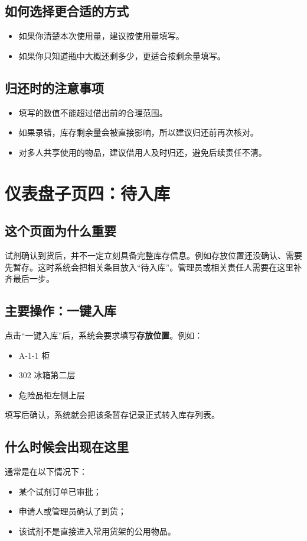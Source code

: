 \documentclass[12pt,a4paper]{ctexart}
\begin{document}
\subsection{如何选择更合适的方式}
\begin{itemize}
  \item 如果你清楚本次使用量，建议按使用量填写。
  \item 如果你只知道瓶中大概还剩多少，更适合按剩余量填写。
\end{itemize}

\subsection{归还时的注意事项}
\begin{itemize}
  \item 填写的数值不能超过借出前的合理范围。
  \item 如果录错，库存剩余量会被直接影响，所以建议归还前再次核对。
  \item 对多人共享使用的物品，建议借用人及时归还，避免后续责任不清。
\end{itemize}

\newpage
\section{仪表盘子页四：待入库}

\subsection{这个页面为什么重要}
试剂确认到货后，并不一定立刻具备完整库存信息。例如存放位置还没确认、需要先暂存。这时系统会把相关条目放入“待入库”。管理员或相关责任人需要在这里补齐最后一步。

\subsection{主要操作：一键入库}
点击“一键入库”后，系统会要求填写\textbf{存放位置}。例如：
\begin{itemize}
  \item A-1-1 柜
  \item 302 冰箱第二层
  \item 危险品柜左侧上层
\end{itemize}

填写后确认，系统就会把该条暂存记录正式转入库存列表。

\subsection{什么时候会出现在这里}
通常是在以下情况下：
\begin{itemize}
  \item 某个试剂订单已审批；
  \item 申请人或管理员确认了到货；
  \item 该试剂不是直接进入常用货架的公用物品。
\end{itemize}
\end{document}
